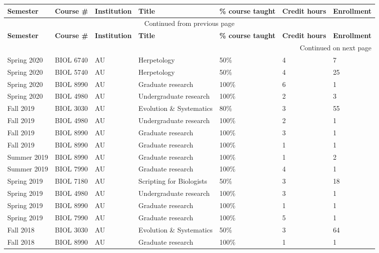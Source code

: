 {\sffamily\small
{}
\begin{longtable}[l]{ p{0.7in} p{0.7in} p{0.7in} p{1.5in} p{0.7in} p{0.4in} p{0.8in} }
    \hline
    \textbf{Semester} & \textbf{Course \#} & \textbf{Institution} & \textbf{Title} & \textbf{\% course taught} & \textbf{Credit hours} & \textbf{Enrollment} \\
    \hline
    \endfirsthead
    \multicolumn{7}{c}{{Continued from previous page}} \\
    \hline
    \textbf{Semester} & \textbf{Course \#} & \textbf{Institution} & \textbf{Title} & \textbf{\% course taught} & \textbf{Credit hours} & \textbf{Enrollment} \\
    \hline
    \endhead
    \hline \multicolumn{7}{|r|}{{Continued on next page}} \\
    \endfoot
    \hline
    \endlastfoot
    Spring 2020 & BIOL 6740 & AU & Herpetology & 50\% & 4 & 7 \\
    Spring 2020 & BIOL 5740 & AU & Herpetology & 50\% & 4 & 25 \\
    Spring 2020 & BIOL 8990 & AU & Graduate research & 100\% & 6 & 1 \\ 
    Spring 2020 & BIOL 4980 & AU & Undergraduate research & 100\% & 2 & 3 \\ 
    Fall 2019 & BIOL 3030 & AU & Evolution \& Systematics & 80\% & 3 & 55 \\
    Fall 2019 & BIOL 4980 & AU & Undergraduate research & 100\% & 2 & 1 \\ 
    Fall 2019 & BIOL 8990 & AU & Graduate research & 100\% & 3 & 1 \\ 
    Fall 2019 & BIOL 8990 & AU & Graduate research & 100\% & 1 & 1 \\ 
    Summer 2019 & BIOL 8990 & AU & Graduate research & 100\% & 1 & 2 \\ 
    Summer 2019 & BIOL 7990 & AU & Graduate research & 100\% & 4 & 1 \\ 
    Spring 2019 & BIOL 7180 & AU & Scripting for Biologists & 50\% & 3 & 18 \\
    Spring 2019 & BIOL 4980 & AU & Undergraduate research & 100\% & 3 & 1 \\ 
    Spring 2019 & BIOL 8990 & AU & Graduate research & 100\% & 1 & 1 \\ 
    Spring 2019 & BIOL 7990 & AU & Graduate research & 100\% & 5 & 1 \\ 
    Fall 2018 & BIOL 3030 & AU & Evolution \& Systematics & 50\% & 3 & 64 \\
    Fall 2018 & BIOL 8990 & AU & Graduate research & 100\% & 1 & 1 \\ 

\end{longtable}}
